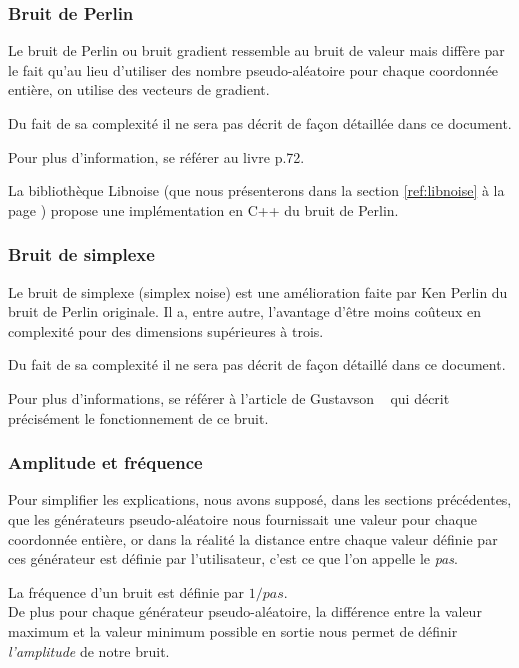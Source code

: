 \subsubsection{Bruit de Perlin}
Le bruit de Perlin ou bruit gradient ressemble au bruit de valeur mais
diffère par le fait qu'au lieu d'utiliser des nombre pseudo-aléatoire pour chaque
coordonnée entière, on utilise des vecteurs de gradient.

Du fait de sa complexité il ne sera pas décrit de façon détaillée dans ce document.

Pour plus d'information, se référer au livre \cite{Eber02} p.72.

La bibliothèque Libnoise (que nous présenterons dans la section \ref{ref:libnoise} à la page \pageref{ref:libnoise}) propose une implémentation en C++ du bruit de Perlin.

\subsubsection{Bruit de simplexe}
Le bruit de simplexe (simplex noise) est une amélioration faite par Ken Perlin
du bruit de Perlin originale.
Il a, entre autre, l'avantage d'être moins coûteux en complexité pour des dimensions supérieures à trois.

Du fait de sa complexité il ne sera pas décrit de façon détaillé dans ce document.

Pour plus d'informations, se référer à l'article de Gustavson ~\cite{SimplexNoise}
qui décrit précisément le fonctionnement de ce bruit.

\subsubsection{Amplitude et fréquence}
Pour simplifier les explications, nous avons supposé, dans les sections précédentes, que les générateurs
pseudo-aléatoire nous fournissait une valeur pour chaque coordonnée entière,
or dans la réalité la distance entre chaque valeur définie par ces générateur
est définie par l'utilisateur, c'est ce que l'on appelle le \emph{pas}.

La fréquence d'un bruit est définie par $1 / pas$.\\

De plus pour chaque générateur pseudo-aléatoire, la différence entre la
valeur maximum et la valeur minimum possible en sortie nous permet de définir
\emph{l'amplitude} de notre bruit.\\

